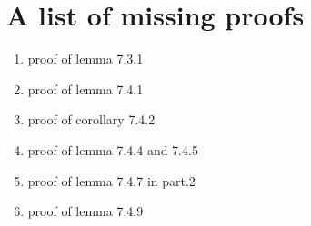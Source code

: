 \documentclass[11pt]{article}
\begin{document}
\section{A list of missing proofs}

\begin{enumerate}
\item proof of lemma 7.3.1
\item proof of lemma 7.4.1
\item proof of corollary 7.4.2
\item proof of lemma 7.4.4 and 7.4.5
\item proof of lemma 7.4.7 in part.2
\item proof of lemma 7.4.9
\end{enumerate}





{}

\end{document}
